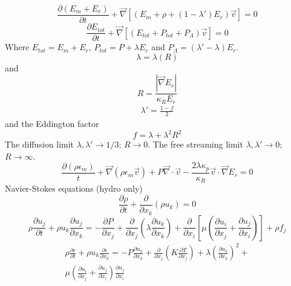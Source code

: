 \documentclass[12pt, a4paper]{article}
\begin{document}
\begin{equation}
    \frac{\partial(E_m+E_r)}{\partial t}+\vec\nabla[(E_m+\rho+(1-\lambda')E_r)\vec v]=0
\end{equation}
\begin{equation}
    \frac{\partial E_{tot}}{\partial t}+\vec \nabla[(E_{tot}+P_{tot}+P_{\Lambda})\vec v]=0
\end{equation}
Where $E_{tot}=E_m+E_r$, $P_{tot}=P+\lambda E_r$ and $P_\Lambda=(\lambda'-\lambda)E_r$.
\begin{equation}
    \lambda=\lambda(R)
\end{equation}
and
\begin{equation}
    R=\frac{| \vec \nabla E_r |}{\kappa_R E_r}
\end{equation}
\begin{eqnarray}
    \lambda'=\frac{1-f}{2}
\end{eqnarray}
and the Eddington factor
\begin{equation}
    f=\lambda+\lambda^2 R^2
\end{equation}
The diffusion limit $\lambda,\lambda'\rightarrow 1/3$; $R\rightarrow 0$.
The free streaming limit $\lambda,\lambda'\rightarrow 0$; $R\rightarrow \infty$.
\begin{equation}
    \frac{\partial (\rho \epsilon_m)}{t}+\vec\nabla(\rho\epsilon_m\vec v)+P\vec\nabla\cdot\vec v -\frac{2\lambda\kappa_p}{\kappa_R}\vec v \cdot \vec \nabla E_r = 0
\end{equation}
Navier-Stokes equations (hydro only)
\begin{equation}
    \frac{\partial \rho}{\partial t} + \frac{\partial}{\partial x_k}(\rho u_k) = 0
\end{equation}
\begin{equation}
    \rho\frac{\partial u_j}{\partial t}+\rho u_k \frac{\partial u_j}{\partial x_k} = -\frac{\partial P}{\partial x_j} +\frac{\partial}{\partial x_j} \left( \lambda\frac{\partial u_k}{\partial x_k} \right) + \frac{\partial}{\partial x_i}\left[ \mu \left( \frac{\partial u_i}{\partial x_j}+\frac{\partial u_j}{\partial x_i} \right) \right] + \rho f_j
\end{equation}
\begin{multline}
    \rho\frac{\partial \epsilon}{\partial t} + \rho u_k \frac{\partial \epsilon}{\partial x_k} = -P\frac{\partial u_k}{\partial x_k} + \frac{\partial}{\partial x_j}\left( K\frac{\partial T}{\partial x_j} \right) + \lambda \left( \frac{\partial u_k}{\partial x_k} \right)^2 + \\ \mu \left( \frac{\partial u_i}{\partial x_j}+\frac{\partial u_j}{\partial x_i} \right) \frac{\partial u_j}{\partial x_i}
\end{multline}
\end{document}
